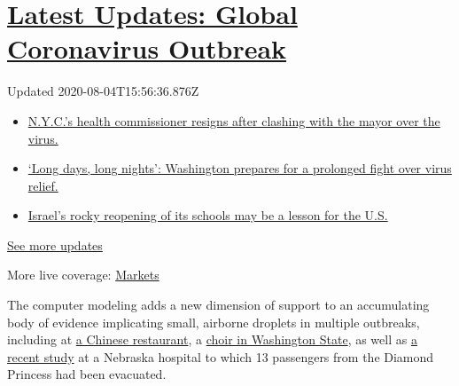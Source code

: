 \hypertarget{latest-updates-global-coronavirus-outbreak}{%
\section{\texorpdfstring{\href{https://www.nytimes.com/2020/08/04/world/coronavirus-covid-19.html?action=click\&pgtype=Article\&state=default\&region=MAIN_CONTENT_1\&context=storylines_live_updates}{Latest
Updates: Global Coronavirus
Outbreak}}{Latest Updates: Global Coronavirus Outbreak}}\label{latest-updates-global-coronavirus-outbreak}}

Updated 2020-08-04T15:56:36.876Z

\begin{itemize}
\tightlist
\item
  \href{https://www.nytimes.com/2020/08/04/world/coronavirus-covid-19.html?action=click\&pgtype=Article\&state=default\&region=MAIN_CONTENT_1\&context=storylines_live_updates\#link-4d1eafa8}{N.Y.C.'s
  health commissioner resigns after clashing with the mayor over the
  virus.}
\item
  \href{https://www.nytimes.com/2020/08/04/world/coronavirus-covid-19.html?action=click\&pgtype=Article\&state=default\&region=MAIN_CONTENT_1\&context=storylines_live_updates\#link-6b644638}{`Long
  days, long nights': Washington prepares for a prolonged fight over
  virus relief.}
\item
  \href{https://www.nytimes.com/2020/08/04/world/coronavirus-covid-19.html?action=click\&pgtype=Article\&state=default\&region=MAIN_CONTENT_1\&context=storylines_live_updates\#link-7af9fca0}{Israel's
  rocky reopening of its schools may be a lesson for the U.S.}
\end{itemize}

\href{https://www.nytimes.com/2020/08/04/world/coronavirus-covid-19.html?action=click\&pgtype=Article\&state=default\&region=MAIN_CONTENT_1\&context=storylines_live_updates}{See
more updates}

More live coverage:
\href{https://www.nytimes.com/live/2020/08/04/business/stock-market-today-coronavirus?action=click\&pgtype=Article\&state=default\&region=MAIN_CONTENT_1\&context=storylines_live_updates}{Markets}

The computer modeling adds a new dimension of support to an accumulating
body of evidence implicating small, airborne droplets in multiple
outbreaks, including at
\href{https://www.nytimes.com/2020/04/20/health/airflow-coronavirus-restaurants.html}{a
Chinese restaurant}, a
\href{https://www.medrxiv.org/content/10.1101/2020.06.15.20132027v2}{choir
in Washington State}, as well as
\href{https://www.nature.com/articles/s41598-020-69286-3}{a recent
study} at a Nebraska hospital to which 13 passengers from the Diamond
Princess had been evacuated.


